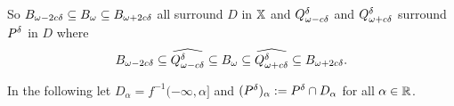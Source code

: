 So $\b\subseteq \B\subseteq \BB$ all surround $D$ in $\X$ and $\Q^\of$ and $\QQ^\of$ surround $P^\of$ in $D$ where
\[ \b\subseteq \ext{\Q^\of}\subseteq \B\subseteq \ext{\QQ^\of}\subseteq \BB.\]
%
%

\clearpage

In the following let $D_\alpha = f^{-1}(-\infty, \alpha]$ and $(\P)_\alpha := \P\cap D_\alpha$ for all $\alpha\in\R$.

